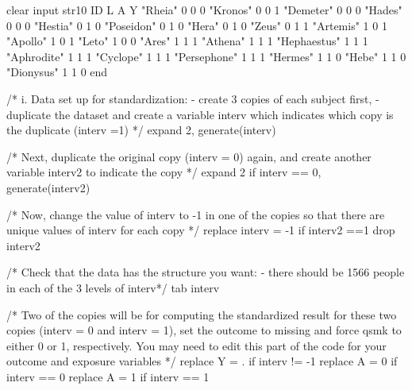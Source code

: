 \documentclass[
  10pt,
  a4paper,
]{book}
\newenvironment{Shaded}{\begin{snugshade}}{\end{snugshade}}
\newcommand{\CommentTok}[1]{\textcolor[rgb]{0.37,0.37,0.37}{#1}}
\newcommand{\KeywordTok}[1]{\textcolor[rgb]{0.00,0.46,0.62}{#1}}
\newcommand{\NormalTok}[1]{\textcolor[rgb]{0.00,0.46,0.62}{#1}}
\newcommand{\StringTok}[1]{\textcolor[rgb]{0.13,0.47,0.30}{#1}}
\begin{document}
\begin{Shaded}
\begin{Highlighting}[]
\KeywordTok{clear}
\NormalTok{input str10 ID L A Y}
\StringTok{"Rheia"}\NormalTok{     0 0 0 }
\StringTok{"Kronos"}\NormalTok{    0 0 1 }
\StringTok{"Demeter"}\NormalTok{   0 0 0 }
\StringTok{"Hades"}\NormalTok{     0 0 0 }
\StringTok{"Hestia"}\NormalTok{    0 1 0 }
\StringTok{"Poseidon"}\NormalTok{  0 1 0 }
\StringTok{"Hera"}\NormalTok{      0 1 0 }
\StringTok{"Zeus"}\NormalTok{      0 1 1 }
\StringTok{"Artemis"}\NormalTok{   1 0 1}
\StringTok{"Apollo"}\NormalTok{    1 0 1}
\StringTok{"Leto"}\NormalTok{      1 0 0}
\StringTok{"Ares"}\NormalTok{      1 1 1}
\StringTok{"Athena"}\NormalTok{    1 1 1}
\StringTok{"Hephaestus"}\NormalTok{ 1 1 1}
\StringTok{"Aphrodite"}\NormalTok{ 1 1 1}
\StringTok{"Cyclope"}\NormalTok{   1 1 1}
\StringTok{"Persephone"}\NormalTok{ 1 1 1}
\StringTok{"Hermes"}\NormalTok{    1 1 0}
\StringTok{"Hebe"}\NormalTok{      1 1 0}
\StringTok{"Dionysus"}\NormalTok{  1 1 0 }
\KeywordTok{end}

\CommentTok{/* i. Data set up for standardization: }
\CommentTok{ {-} create 3 copies of each subject first, }
\CommentTok{ {-} duplicate the dataset and create a variable \textasciigrave{}interv\textasciigrave{} which indicates}
\CommentTok{which copy is the duplicate (interv =1) */}
\NormalTok{expand 2, }\KeywordTok{generate}\NormalTok{(interv)}

\CommentTok{/* Next, duplicate the original copy (interv = 0) again, and create}
\CommentTok{another variable \textquotesingle{}interv2\textquotesingle{} to indicate the copy */}
\NormalTok{expand 2 }\KeywordTok{if}\NormalTok{ interv == 0, }\KeywordTok{generate}\NormalTok{(interv2)}

\CommentTok{/* Now, change the value of \textquotesingle{}interv\textquotesingle{} to {-}1 in one of the copies so that}
\CommentTok{there are unique values of interv for each copy */}
\KeywordTok{replace}\NormalTok{ interv = {-}1  }\KeywordTok{if}\NormalTok{ interv2 ==1}
\KeywordTok{drop}\NormalTok{ interv2}

\CommentTok{/* Check that the data has the structure you want: }
\CommentTok{ {-} there should be 1566 people in each of the 3 levels of interv*/}
\KeywordTok{tab}\NormalTok{ interv}

\CommentTok{/* Two of the copies will be for computing the standardized result}
\CommentTok{for these two copies (interv = 0 and interv = 1), set the outcome to}
\CommentTok{missing and force qsmk to either 0 or 1, respectively.}
\CommentTok{You may need to edit this part of the code for your outcome and exposure variables */}
\KeywordTok{replace}\NormalTok{ Y = . }\KeywordTok{if}\NormalTok{ interv != {-}1}
\KeywordTok{replace}\NormalTok{ A = 0 }\KeywordTok{if}\NormalTok{ interv == 0}
\KeywordTok{replace}\NormalTok{ A = 1 }\KeywordTok{if}\NormalTok{ interv == 1}


\end{Highlighting}
\end{Shaded}
\end{document}

